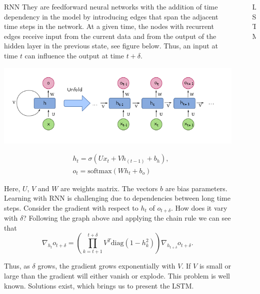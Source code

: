 \documentclass[final]{beamer}
\newlength{\sepwidth}
\newlength{\colwidth}
\newcommand{\separatorcolumn}{\begin{column}{\sepwidth}\end{column}}
\begin{document}
\begin{frame}[t]
\begin{columns}[t]
\begin{column}{\colwidth}
\begin{block}{RNN}
They are feedforward neural networks with the addition of time dependency in
the model by introducing edges that span the adjacent time steps in the
network. At a given time, the nodes with recurrent edges receive input from the
current data and from the output of the hidden layer in the previous state, see
figure below. Thus, an input at time $t$ can influence the output at time $t + \delta$.
\begin{center}
    \includegraphics[width = 0.9\linewidth]{RNN.png}
\end{center}
\begin{align*}
    &h_t = \sigma(U x_t + V h_{(t-1)} + b_h)\text{,}\\
    &o_t = \text{softmax}(W h_t + b_o)
\end{align*}

Here, $ U$, $V$ and $W$ are weights matrix. The vectors $b$ are bias
parameters. Learning with RNN is challenging due to dependencies between long
time steps. Consider the gradient with respect to $h_t$ of $o_{t + \delta}$.
How does it vary with $\delta$? Following the graph above and applying the
chain rule we can see that
\begin{equation*}
  \nabla_{h_t} o_{t + \delta} = \left( \prod_{k = t+1}^{t+\delta} V^T
  \text{diag}(1 - h^2_k) \right)\nabla_{h_{t + \delta}}o_{t + \delta}.
\end{equation*}

Thus, as $\delta$ grows, the gradient grows exponentially with $V$. If $V$ is
small or large than the gradient will either vanish or explode. This problem is
well known. Solutions exist, which brings us to present the LSTM.
\end{block}
\end{column}
\separatorcolumn

\begin{column}{\colwidth}
\begin{block}{LSTM}


\end{block}
\end{column}
\end{columns}
\end{frame}
\end{document}
